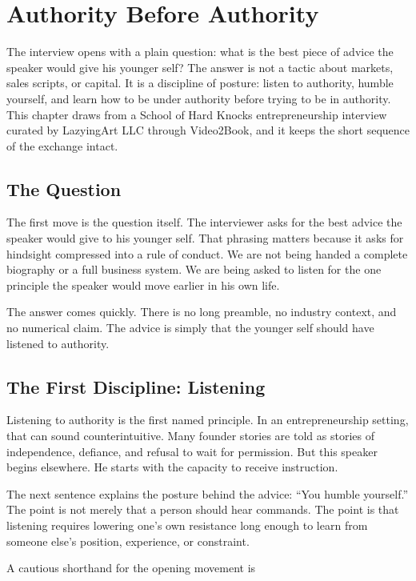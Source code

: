 \chapter{Authority Before Authority}

The interview opens with a plain question: what is the best piece of advice the speaker would give his younger self? The answer is not a tactic about markets, sales scripts, or capital. It is a discipline of posture: listen to authority, humble yourself, and learn how to be under authority before trying to be in authority. This chapter draws from a School of Hard Knocks entrepreneurship interview curated by LazyingArt LLC through Video2Book, and it keeps the short sequence of the exchange intact.

\section{The Question}

The first move is the question itself. The interviewer asks for the best advice the speaker would give to his younger self. That phrasing matters because it asks for hindsight compressed into a rule of conduct. We are not being handed a complete biography or a full business system. We are being asked to listen for the one principle the speaker would move earlier in his own life.

The answer comes quickly. There is no long preamble, no industry context, and no numerical claim. The advice is simply that the younger self should have listened to authority.

\section{The First Discipline: Listening}

Listening to authority is the first named principle. In an entrepreneurship setting, that can sound counterintuitive. Many founder stories are told as stories of independence, defiance, and refusal to wait for permission. But this speaker begins elsewhere. He starts with the capacity to receive instruction.

The next sentence explains the posture behind the advice: ``You humble yourself.'' The point is not merely that a person should hear commands. The point is that listening requires lowering one's own resistance long enough to learn from someone else's position, experience, or constraint.

A cautious shorthand for the opening movement is

